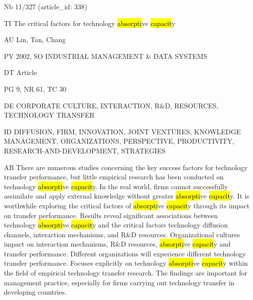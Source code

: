 \documentclass[a4paper]{article}
\begin{document}
\vspace*{-2cm}
Nb \tabto{0cm}11/327 (article\_id: 338)\par
TI \tabto{0cm}The critical factors for technology \hl{absorpti}ve \hl{capacit}y\par
AU \tabto{0cm}Lin, Tan, Chang\par
PY \tabto{0cm}2002, SO INDUSTRIAL MANAGEMENT \& DATA SYSTEMS\par
DT \tabto{0cm}Article\par
PG \tabto{0cm}9, NR 61, TC 30\par
DE \tabto{0cm}CORPORATE CULTURE, INTERACTION, R\&D, RESOURCES, TECHNOLOGY TRANSFER\par
ID \tabto{0cm}DIFFUSION, FIRM, INNOVATION, JOINT VENTURES, KNOWLEDGE MANAGEMENT, ORGANIZATIONS, PERSPECTIVE, PRODUCTIVITY, RESEARCH-AND-DEVELOPMENT, STRATEGIES\par
AB \tabto{0cm}There are numerous studies concerning the key success factors for technology transfer performance, but little empirical research has been conducted on technology \hl{absorpti}ve \hl{capacit}y. In the real world, firms cannot successfully assimilate and apply external knowledge without greater \hl{absorpti}ve \hl{capacit}y. It is worthwhile exploring the critical factors of \hl{absorpti}ve \hl{capacit}y through its impact on transfer performance. Results reveal significant associations between technology \hl{absorpti}ve \hl{capacit}y and the critical factors technology diffusion channels, interaction mechanisms, and R\&D resources. Organizational cultures impact on interaction mechanisms, R\&D resources, \hl{absorpti}ve \hl{capacit}y and transfer performance. Different organizations will experience different technology transfer performance. Focuses explicitly on technology \hl{absorpti}ve \hl{capacit}y within the field of empirical technology transfer research. The findings are important for management practice, especially for firms carrying out technology transfer in developing countries.\par
\clearpage
\end{document}
